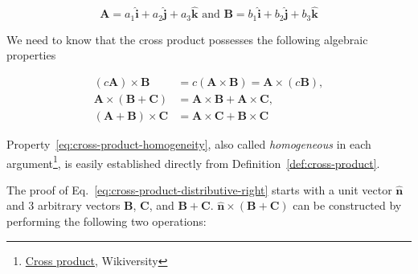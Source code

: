 \begin{equation}\label{eq:cross-product-of-two}
    \boldsymbol{A} = a_1\boldsymbol{\hat{i}} + a_2\boldsymbol{\hat{j}} + a_3\boldsymbol{\hat{k}} \text{\ \ \ \ \ \ and \ \ \ \ \ \ }
    \boldsymbol{B} = b_1\boldsymbol{\hat{i}} + b_2\boldsymbol{\hat{j}} + b_3\boldsymbol{\hat{k}}
\end{equation}

We need to know that the cross product possesses the following algebraic properties

\begin{align}
    (c\boldsymbol{A}) \times \boldsymbol{B} &= c(\boldsymbol{A} \times \boldsymbol{B}) = \boldsymbol{A} \times (c\boldsymbol{B})\label{eq:cross-product-homogeneity}, \\
    \boldsymbol{A} \times (\boldsymbol{B} + \boldsymbol{C}) &= \boldsymbol{A} \times \boldsymbol{B} + \boldsymbol{A} \times \boldsymbol{C}\label{eq:cross-product-distributive-right}, \\
    (\boldsymbol{A} + \boldsymbol{B}) \times \boldsymbol{C} &= \boldsymbol{A} \times \boldsymbol{C} + \boldsymbol{B} \times \boldsymbol{C}\label{eq:cross-product-distributive-left}
\end{align}

Property~\ref{eq:cross-product-homogeneity}, also called \textit{homogeneous} in each
argument\footnote{\href{https://en.wikiversity.org/wiki/Cross_product}{Cross product}, Wikiversity}, is easily
established directly from Definition~\ref{def:cross-product}.

The proof of Eq.~\ref{eq:cross-product-distributive-right} starts with a unit vector $\boldsymbol{\hat{n}}$ and 3
arbitrary vectors $\boldsymbol{B}$, $\boldsymbol{C}$, and $\boldsymbol{B + C}$.
$\boldsymbol{\hat{n}} \times \boldsymbol{(B + C)}$ can be constructed by performing the following two operations:


